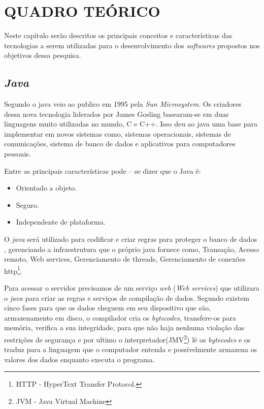 \chapter{QUADRO TEÓRICO}

	\par Neste capítulo serão descritos os principais conceitos e características
das tecnologias a serem utilizadas para o desenvolvimento dos \textit{softwares}
propostos nos objetivos dessa pesquisa.

\section{\textit{Java}}

	\par Segundo  o java veio ao publico em 1995 pela
\textit{Sun Microsystem}. Os criadores dessa nova tecnologia liderados por
James Gosling basearam-se em duas linguagens muito utilizadas no mundo, C e C++.
Isso deu ao java uma base para implementar em novos sistemas como, sistemas
operacionais, sistemas de comunicações, sistema de banco de dados e aplicativos
para computadores pessoais.

	\par Entre as principais características pode – se dizer que o Java é:
	
	\begin{itemize}

	  \item Orientado a objeto.
	  
	  \item Seguro.
	  
	  \item Independente de plataforma. 

	\end{itemize}
	
	\par {} O \textit{java} será utilizado para codificar e
criar regras para proteger o banco de dados , gerenciando a infraestrutura que
o próprio java fornece como, Transação, Acesso remoto, Web services,
Gerenciamento de threads, Gerenciamento de conexões http\footnote{HTTP -
HyperText Transfer Protocol.}.

	\par Para acessar o servidor precisamos de um serviço \textit{web} (\textit{Web
services}) que utilizara o \textit{java} para criar as regras e serviços de
compilação de dados. Segundo  existem cinco fases para
que os dados cheguem em seu dispositivo que são, armazenamento em disco, o
compilador cria os \textit{bytecodes}, transfere-os para memória, verifica a sua
integridade, para que não haja nenhuma violação das restrições de segurança e
por ultimo o interpretador(JMV\footnote{JVM - Java Virtual Machine}) lê os
\textit{bytecodes} e os traduz para a linguagem que o computador entenda e possivelmente armazena os valores dos
dados enquanto executa o programa.

